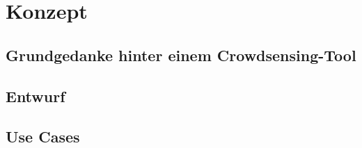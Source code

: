 \chapter{Konzept} %


\section{Grundgedanke hinter einem Crowdsensing-Tool}

\section{Entwurf}

\section{Use Cases}